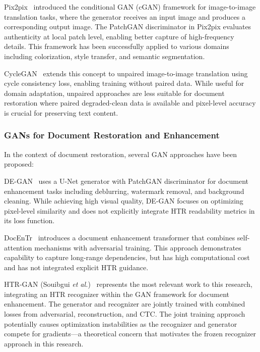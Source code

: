 \documentclass[journal]{IEEEtran}
\begin{document}
Pix2pix~\cite{isola2017image} introduced the conditional GAN (cGAN) framework for image-to-image translation tasks, where the generator receives an input image and produces a corresponding output image. The PatchGAN discriminator in Pix2pix evaluates authenticity at local patch level, enabling better capture of high-frequency details. This framework has been successfully applied to various domains including colorization, style transfer, and semantic segmentation.

CycleGAN~\cite{zhu2017unpaired} extends this concept to unpaired image-to-image translation using cycle consistency loss, enabling training without paired data. While useful for domain adaptation, unpaired approaches are less suitable for document restoration where paired degraded-clean data is available and pixel-level accuracy is crucial for preserving text content.

\subsubsection{GANs for Document Restoration and Enhancement}

In the context of document restoration, several GAN approaches have been proposed:

DE-GAN~\cite{souibgui2020degan} uses a U-Net generator with PatchGAN discriminator for document enhancement tasks including deblurring, watermark removal, and background cleaning. While achieving high visual quality, DE-GAN focuses on optimizing pixel-level similarity and does not explicitly integrate HTR readability metrics in its loss function.

DocEnTr~\cite{souibgui2022docent} introduces a document enhancement transformer that combines self-attention mechanisms with adversarial training. This approach demonstrates capability to capture long-range dependencies, but has high computational cost and has not integrated explicit HTR guidance.

HTR-GAN (Souibgui \textit{et al.})~\cite{souibgui2021enhance} represents the most relevant work to this research, integrating an HTR recognizer within the GAN framework for document enhancement. The generator and recognizer are jointly trained with combined losses from adversarial, reconstruction, and CTC. The joint training approach potentially causes optimization instabilities as the recognizer and generator compete for gradients—a theoretical concern that motivates the frozen recognizer approach in this research.
\end{document}
